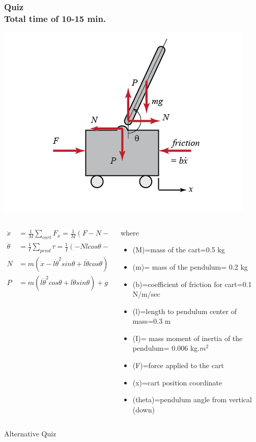 \documentclass[hyperref={pdfpagelabels=true}]{beamer}
\newcounter{angle}
\begin{document}
\begin{frame}[shrink]
\frametitle{Quiz \\ Total time of 10-15 min.}
\centering
\includegraphics[scale = 0.35]{figs/Selection_045.png} \\

\begin{columns}

\begin{column}{0.45\textwidth}
\scriptsize{
\begin{align*}
\ddot{x}&=\frac{1}{M}\sum_{cart}F_x=\frac{1}{M}(F-N-b\dot{x}) \ &\text{(1)} \\
\ddot{\theta}&=\frac{1}{I}\sum_{pend}\tau=\frac{1}{I}(-Nlcos\theta-Plsin\theta) \ &\text{(2)} \\
N&=m(\ddot{x}-l\dot{\theta}^2sin\theta+l\ddot{\theta}cos\theta) \ &\text{(3)} \\
P&=m(l\dot{\theta}^2 cos\theta+l\ddot{\theta}sin\theta)+g \ &\text{(4)}
\end{align*}
}
\end{column}

\begin{column}{0.5\textwidth}
\tiny{
where \\
\begin{itemize}
\item (M)=mass of the cart=0.5 kg
\item (m)= mass of the pendulum= 0.2 kg
\item (b)=coefficient of friction for cart=0.1 N/m/sec
\item (l)=length to pendulum center of mass=0.3 m
\item (I)= mass moment of inertia of the pendulum= 0.006 kg.$m^2$
\item (F)=force applied to the cart
\item (x)=cart position coordinate 
\item (theta)=pendulum angle from vertical (down)
\end{itemize}
}
\end{column}
\end{columns}

\noindent\makebox[\linewidth]{\rule{10 cm}{0.1pt}}
{\tiny Alternative Quiz}
\href{http://ctms.engin.umich.edu/CTMS/index.php?example=BallBeam&section=SimulinkModeling}{}
\end{frame}
\end{document}
